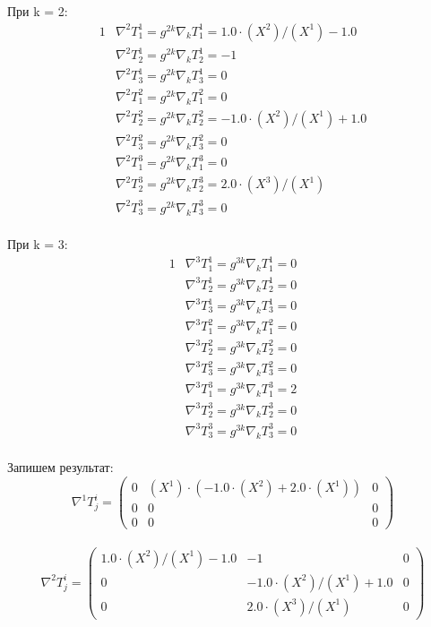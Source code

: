 \documentclass[a4paper, 12pt, oneside]{article}
\begin{document}
При k = 2:\\
\begin{alignat*}{1}
  & \nabla^2T^1_1 = g^{2k}\nabla_kT^1_1 = 1.0\cdot (X^2)/(X^1) - 1.0 \\
  & \nabla^2T^1_2 = g^{2k}\nabla_kT^1_2 = -1 \\
  & \nabla^2T^1_3 = g^{2k}\nabla_kT^1_3 = 0 \\
  & \nabla^2T^2_1 = g^{2k}\nabla_kT^2_1 = 0 \\
  & \nabla^2T^2_2 = g^{2k}\nabla_kT^2_2 = -1.0\cdot (X^2)/(X^1) + 1.0 \\
  & \nabla^2T^2_3 = g^{2k}\nabla_kT^2_3 = 0 \\
  & \nabla^2T^3_1 = g^{2k}\nabla_kT^3_1 = 0 \\
  & \nabla^2T^3_2 = g^{2k}\nabla_kT^3_2 = 2.0\cdot (X^3)/(X^1) \\
  & \nabla^2T^3_3 = g^{2k}\nabla_kT^3_3 = 0 
\end{alignat*}\\
При k = 3:\\
\begin{alignat*}{1}
  & \nabla^3T^1_1 = g^{3k}\nabla_kT^1_1 = 0 \\
  & \nabla^3T^1_2 = g^{3k}\nabla_kT^1_2 = 0 \\
  & \nabla^3T^1_3 = g^{3k}\nabla_kT^1_3 = 0 \\
  & \nabla^3T^2_1 = g^{3k}\nabla_kT^2_1 = 0 \\
  & \nabla^3T^2_2 = g^{3k}\nabla_kT^2_2 = 0 \\
  & \nabla^3T^2_3 = g^{3k}\nabla_kT^2_3 = 0 \\
  & \nabla^3T^3_1 = g^{3k}\nabla_kT^3_1 = 2 \\
  & \nabla^3T^3_2 = g^{3k}\nabla_kT^3_2 = 0 \\
  & \nabla^3T^3_3 = g^{3k}\nabla_kT^3_3 = 0 
\end{alignat*}\\
Запишем результат:\\
\[
\nabla^1T^i_j = \begin{pmatrix}
	0 & (X^1)\cdot (-1.0\cdot (X^2) + 2.0\cdot (X^1)) & 0\\
	0 & 0 & 0\\
	0 & 0 & 0
\end{pmatrix}
\]\\
\[
\nabla^2T^i_j = \begin{pmatrix}
	1.0\cdot (X^2)/(X^1) - 1.0 & -1 & 0\\
	0 & -1.0\cdot (X^2)/(X^1) + 1.0 & 0\\
	0 & 2.0\cdot (X^3)/(X^1) & 0
\end{pmatrix}
\]\\
\end{document}
